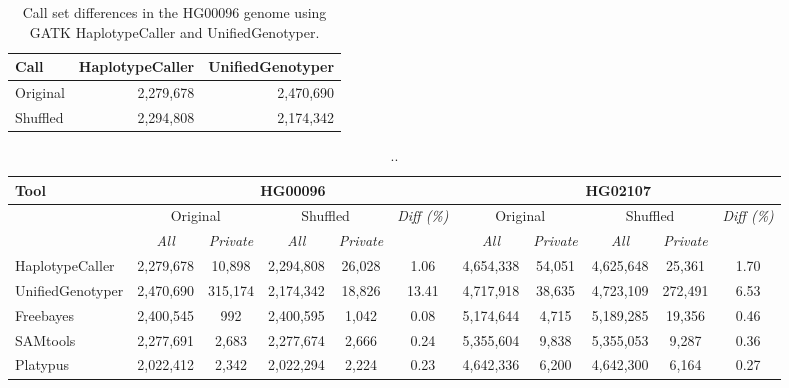 
\begin{table}[htb]
\begin{center}
\begin{tabular}{|l|r|r|}
\hline
{\bf Call} & {\bf HaplotypeCaller} & {\bf UnifiedGenotyper}\\
\hline
Original & 2,279,678 & 2,470,690\\
Shuffled & 2,294,808 & 2,174,342 \\
\hline
\end{tabular}
\end{center}
\caption{Call set differences in the HG00096 genome using GATK HaplotypeCaller and UnifiedGenotyper.
}
\label{supptab:gatk-orig-shuf-lowcov}
\end{table}




\begin{table}[htb]
\begin{center}
\begin{tabular}{|l|c|c||c|c||c||c|c||c|c||c|}
\hline
{\bf Tool} & \multicolumn{5}{|c||}{\bf HG00096} & \multicolumn{5}{|c|}{\bf HG02107} \\
\hline
{\bf } & \multicolumn{2}{c||}{Original} & \multicolumn{2}{c||}{Shuffled} & {\it Diff (\%) }
& \multicolumn{2}{c||}{Original} & \multicolumn{2}{c||}{Shuffled} & {\it Diff (\%) } \\
\cline{2-11}
{\bf } & {\it All } & {\it Private } & {\it All } & {\it Private } & {\it }
& {\it All } & {\it Private } &  {\it All } & {\it Private } & {\it }\\
\hline
HaplotypeCaller & 2,279,678 & 10,898 & 2,294,808 & 26,028 & 1.06 & 4,654,338 & 54,051 & 4,625,648 & 25,361 & 1.70 \\
UnifiedGenotyper & 2,470,690 & 315,174 & 2,174,342 & 18,826 & 13.41 & 4,717,918 & 38,635 & 4,723,109 & 272,491 & 6.53 \\
Freebayes & 2,400,545 & 992 & 2,400,595 & 1,042 & 0.08 & 5,174,644 & 4,715 & 5,189,285 & 19,356 & 0.46 \\
SAMtools & 2,277,691 & 2,683 & 2,277,674 & 2,666 & 0.24 & 5,355,604 & 9,838 & 5,355,053 & 9,287 & 0.36 \\
Platypus & 2,022,412 & 2,342 & 2,022,294 & 2,224 & 0.23 & 4,642,336 & 6,200 & 4,642,300 & 6,164 & 0.27 \\
\hline
\end{tabular}
\end{center}
\caption{ .. }
\label{tab:snps-orig-vs-shuf}
\end{table}

